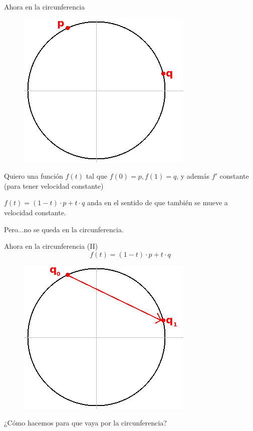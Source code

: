 \documentclass[10pt]{beamer}
\begin{document}
\begin{frame}{Ahora en la circunferencia}


\begin{figure}  		
  	\centering
	\includegraphics[scale=0.5]{slerpR2_p.png}
\end{figure}

Quiero una función $f(t)$ tal que $f(0) = p, f(1) = q$, y además $f'$ constante (para tener velocidad constante)

$f(t) = (1-t) \cdot p + t\cdot q$ anda en el sentido de que también se mueve a velocidad constante.

Pero...no se queda en la circunferencia.



\end{frame}


\begin{frame}{Ahora en la circunferencia (II)} %
$$f(t) = (1-t)\cdot p + t\cdot q$$

\begin{figure}  		
  	\centering
	\includegraphics[scale=0.5]{slerpR2_2_p.png}
\end{figure} \pause

¿Cómo hacemos para que vaya por la circunferencia? \pause

\end{frame}
\end{document}
